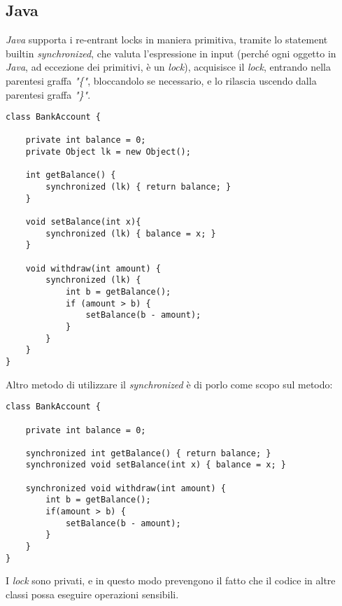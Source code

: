 \subsection{Java}
\textit{Java} supporta i re-entrant locks in maniera primitiva, tramite lo statement builtin \textit{synchronized}, che valuta l'espressione in input (perché ogni oggetto in \textit{Java}, ad eccezione dei primitivi, è un \textit{lock}), acquisisce il \textit{lock}, entrando nella parentesi graffa \textit{"\{"}, bloccandolo se necessario, e lo rilascia uscendo dalla parentesi graffa \textit{"\}"}.
\begin{lstlisting}
class BankAccount {

	private int balance = 0;
	private Object lk = new Object();

	int getBalance() {
		synchronized (lk) { return balance; }
	}

	void setBalance(int x){
		synchronized (lk) { balance = x; }
	}

	void withdraw(int amount) {
		synchronized (lk) {
			int b = getBalance();
			if (amount > b) {
				setBalance(b - amount);
			}
		}
	}
}
\end{lstlisting}

\newpage
Altro metodo di utilizzare il \textit{synchronized} è di porlo come scopo sul metodo:
\begin{lstlisting}
class BankAccount {

	private int balance = 0;

	synchronized int getBalance() { return balance; }
	synchronized void setBalance(int x) { balance = x; }

	synchronized void withdraw(int amount) {
		int b = getBalance();
		if(amount > b) {
			setBalance(b - amount);
		}
	}
}
\end{lstlisting}
I \textit{lock} sono privati, e in questo modo prevengono il fatto che il codice in altre classi possa eseguire operazioni sensibili.